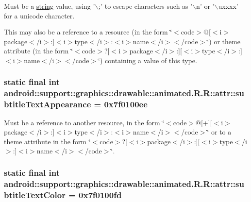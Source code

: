Must be a \hyperlink{classandroid_1_1support_1_1graphics_1_1drawable_1_1animated_1_1_r_1_1string}{string} value, using '$\backslash$;' to escape characters such as '$\backslash$n' or '$\backslash$uxxxx' for a unicode character. 

This may also be a reference to a resource (in the form \char`\"{}$<$code$>$@\mbox{[}$<$i$>$package$<$/i$>$:\mbox{]}$<$i$>$type$<$/i$>$:$<$i$>$name$<$/i$>$$<$/code$>$\char`\"{}) or theme attribute (in the form \char`\"{}$<$code$>$?\mbox{[}$<$i$>$package$<$/i$>$:\mbox{]}\mbox{[}$<$i$>$type$<$/i$>$:\mbox{]}$<$i$>$name$<$/i$>$$<$/code$>$\char`\"{}) containing a value of this type. \hypertarget{classandroid_1_1support_1_1graphics_1_1drawable_1_1animated_1_1_r_1_1attr_1913e8aa7c0bd5508c3d74a06a1fcad5}{
\subsubsection[{subtitleTextAppearance}]{\setlength{\rightskip}{0pt plus 5cm}static final int android::support::graphics::drawable::animated.R.R::attr::subtitleTextAppearance = 0x7f0100ee}}
\label{classandroid_1_1support_1_1graphics_1_1drawable_1_1animated_1_1_r_1_1attr_1913e8aa7c0bd5508c3d74a06a1fcad5}


Must be a reference to another resource, in the form \char`\"{}$<$code$>$@\mbox{[}+\mbox{]}\mbox{[}$<$i$>$package$<$/i$>$:\mbox{]}$<$i$>$type$<$/i$>$:$<$i$>$name$<$/i$>$$<$/code$>$\char`\"{} or to a theme attribute in the form \char`\"{}$<$code$>$?\mbox{[}$<$i$>$package$<$/i$>$:\mbox{]}\mbox{[}$<$i$>$type$<$/i$>$:\mbox{]}$<$i$>$name$<$/i$>$$<$/code$>$\char`\"{}. \hypertarget{classandroid_1_1support_1_1graphics_1_1drawable_1_1animated_1_1_r_1_1attr_94e9055978f852ee4b6bc3f6ef3c5a43}{
\subsubsection[{subtitleTextColor}]{\setlength{\rightskip}{0pt plus 5cm}static final int android::support::graphics::drawable::animated.R.R::attr::subtitleTextColor = 0x7f0100fd}}
\label{classandroid_1_1support_1_1graphics_1_1drawable_1_1animated_1_1_r_1_1attr_94e9055978f852ee4b6bc3f6ef3c5a43}


